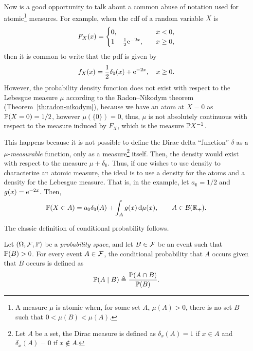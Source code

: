 \begin{note} \label{note:dirac_function}
    Now is a good opportunity to talk about a common abuse of notation used for atomic\footnote{A measure $\mu$ is atomic when, for some set $A$, $\mu(A)>0$, there is no set $B$ such that $0<\mu(B)<\mu(A)$.} measures.
    For example, when the cdf of a random variable $X$ is
    \begin{align*}
        F_X(x) = 
        \begin{cases}
            0, & \quad x < 0,\\
            1 - \frac{1}{2}\euler^{-2x}, & \quad x\ge 0,
        \end{cases}
    \end{align*}
    then it is common to write that the pdf is given by
    \begin{align*}
        f_X(x) = \frac{1}{2}\delta_0(x) + \euler^{-2x}, \quad x\ge 0.
    \end{align*}
    However, the probability density function does not exist with respect to the Lebesgue measure $\mu$ according to the Radon--Nikodym theorem (Theorem~\ref{th:radon-nikodym}), because we have an atom at $X=0$ as $\P(X=0)=1/2$, however $\mu(\{0\})=0$, thus, $\mu$ is not absolutely continuous with respect to the measure induced by $F_X$, which is the measure $\P X^{-1}$.
    
    This happens because it is not possible to define the Dirac delta ``function'' $\delta$ as a $\mu$-\textit{measurable} function, only as a measure\footnote{Let $A$ be a set, the Dirac measure is defined as $\delta_x(A) = 1$ if $x\in A$ and $\delta_x(A) = 0$ if $x\notin A$.} itself.
    Then, the density would exist with respect to the measure $\mu+\delta_0$.
    Thus, if one wishes to use density to characterize an atomic measure, the ideal is to use a density for the atoms and a density for the Lebesgue measure.
    That is, in the example, let $a_0 = 1/2$ and $g(x) = \euler^{-2x}$. Then,
    \begin{align*}
        \P(X\in A) = a_0\delta_0(A) + \int_A g(x)\,\d\mu(x), \qquad A\in\cal{B}(\R_+).
    \end{align*}
\end{note}

The classic definition of conditional probability follows.
    \begin{definition} \label{def:cond_prob}
    Let $(\Omega,\cal{F},\P)$ be a \textit{probability space}, and let $B\in\cal F$ be an event such that $\P(B)>0$. For every event $A\in \cal F$, the conditional probability that $A$ occurs given that $B$ occurs is defined as
    \begin{align*}
        \P(A\mid B) \triangleq \frac{\P(A \cap B)}{\P(B)}.
    \end{align*}
\end{definition}

